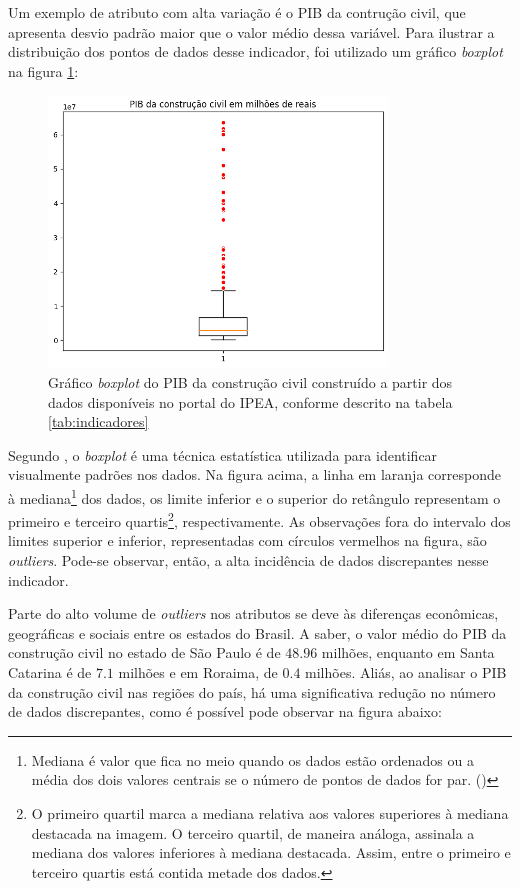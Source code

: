 Um exemplo de atributo com alta variação é o PIB da contrução civil,
que apresenta desvio padrão maior que o valor médio dessa variável.
Para ilustrar a distribuição dos pontos de dados desse indicador, foi utilizado 
um gráfico \textit{boxplot} na figura \ref{fig:boxplot_pibcc}:

\begin{figure}[H]
    \centering
    \includegraphics[width=9cm]{../figuras/graficos/boxplot-pib-cc.png}
    \caption{Gráfico \textit{boxplot} do PIB da construção civil construído a partir dos dados disponíveis no portal do IPEA, conforme descrito na tabela \ref{tab:indicadores}}
    \label{fig:boxplot_pibcc}
\end{figure}

Segundo \citet{boxplot}, o \textit{boxplot} é
uma técnica estatística utilizada para identificar visualmente padrões nos dados. 
Na figura acima, a linha em laranja corresponde à mediana\footnote{Mediana é
valor que fica no meio quando os dados estão ordenados ou a média
dos dois valores centrais se o número de pontos de dados for par.
(\cite{boxplot-stat})} 
dos dados, os limite inferior e o superior do retângulo representam
o primeiro e terceiro quartis\footnote{O primeiro quartil marca a mediana 
relativa aos valores superiores à mediana destacada na imagem. O terceiro quartil,
de maneira análoga, assinala a mediana dos valores inferiores à mediana destacada. 
Assim, entre o primeiro e terceiro quartis está contida metade
dos dados.}, respectivamente. As observações fora do intervalo dos limites 
superior e inferior, representadas com círculos vermelhos na figura, são 
\textit{outliers}. Pode-se observar, então, a alta incidência de dados discrepantes
nesse indicador.

Parte do alto volume de \textit{outliers} nos atributos se deve às diferenças
econômicas, geográficas e sociais entre os estados do Brasil. A saber, o valor 
médio do PIB da construção civil no estado 
de São Paulo é de $48.96$ milhões, enquanto em Santa Catarina é de $7.1$ milhões e 
em Roraima, de $0.4$ milhões. Aliás, ao analisar o PIB da construção civil nas 
regiões do país, há uma significativa redução no número de dados discrepantes, como é possível
pode observar na figura abaixo:

